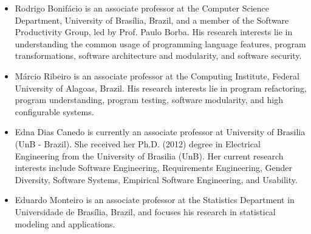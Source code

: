 \documentclass{article}
\begin{document}
\begin{itemize}
\item Rodrigo Bonif\'{a}cio is an associate professor at the Computer Science Department, University of Brasília, Brazil, and a member of the Software Productivity Group, led by Prof. Paulo Borba. His research interests lie in understanding
  the common usage of programming language features, program transformations, software architecture and modularity, and software security.

\item M\'{a}rcio Ribeiro is an associate professor at the Computing Institute, Federal University of Alagoas, Brazil. His research interests lie in program refactoring, program understanding, program testing, software modularity, and high configurable systems. 
  
\item Edna Dias Canedo is currently an associate professor at University of Brasilia (UnB - Brazil). She received her Ph.D. (2012) degree in Electrical Engineering from the University of Brasilia (UnB).
  Her current research interests include Software Engineering, Requirements Engineering, Gender Diversity, Software Systems, Empirical Software Engineering, and Usability.

\item Eduardo Monteiro is an associate professor at the Statistics Department in Universidade de Brasília, Brazil, and focuses his research in statistical modeling and applications.  
\end{itemize}
\end{document}

